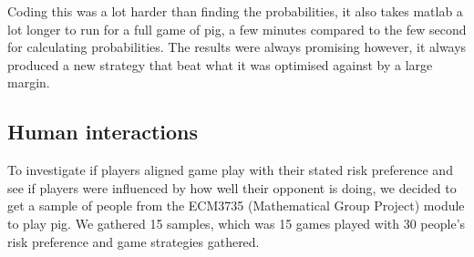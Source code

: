 \documentclass[a4paper,titlepage]{article}
\begin{document}
Coding this was a lot harder than finding the probabilities, it also takes matlab a lot longer to run for a full game of pig, a few minutes compared to the few second for calculating probabilities. The results were always promising however, it always produced a new strategy that beat what it was optimised against by a large margin.

\subsection{Human interactions}
To investigate if players aligned game play with their stated risk preference and see if players were influenced by how well their opponent is doing, we decided to get a sample of people from the ECM3735 (Mathematical Group Project) module to play pig. We gathered 15 samples, which was 15 games played with 30 people’s risk preference and game strategies gathered.
\end{document}
